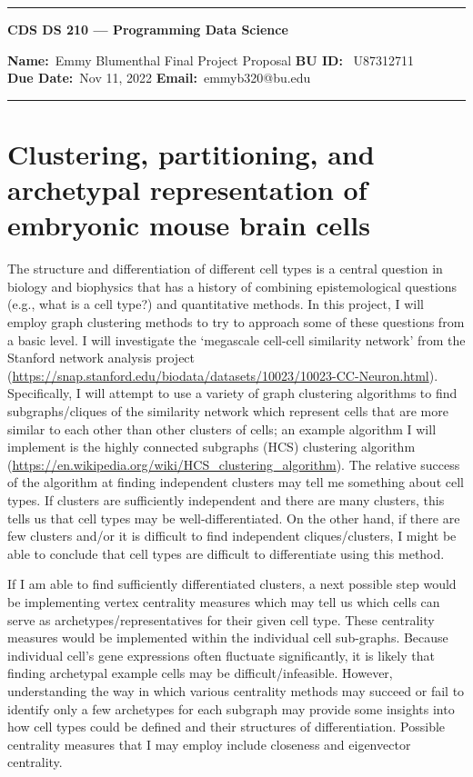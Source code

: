 \documentclass[10pt]{article}
\newcommand{\1}{\mathbf 1}
\begin{document}
\begin{center}
	\hrule
	\vspace{.4cm}
	{\textbf { \large CDS DS 210 --- Programming Data Science}}
\end{center}
{\textbf{Name:}\ Emmy Blumenthal \hspace{\fill} Final Project Proposal\hspace{\fill}  \textbf{BU ID:} \ U87312711 \\
\textbf{Due Date:}\  Nov 11, 2022   \hspace{\fill} \textbf{Email:}\ emmyb320@bu.edu \ 
\vspace{.4cm}
\hrule

\section*{Clustering, partitioning, and archetypal representation of embryonic mouse brain cells}


The structure and differentiation of different cell types is a central question in biology and biophysics that has a history of combining epistemological questions (e.g., what is a cell type?) and quantitative methods.
In this project, I will employ graph clustering methods to try to approach some of these questions from a basic level.
I will investigate the `megascale cell-cell similarity network' from the Stanford network analysis project (\url{https://snap.stanford.edu/biodata/datasets/10023/10023-CC-Neuron.html}).
Specifically, I will attempt to use a variety of graph clustering algorithms to find subgraphs/cliques of the similarity network which represent cells that are more similar to each other than other clusters of cells; an example algorithm I will implement is the highly connected subgraphs (HCS) clustering algorithm (\url{https://en.wikipedia.org/wiki/HCS_clustering_algorithm}).
The relative success of the algorithm at finding independent clusters may tell me something about cell types.
If clusters are sufficiently independent and there are many clusters, this tells us that cell types may be well-differentiated.
On the other hand, if there are few clusters and/or it is difficult to find independent cliques/clusters, I might be able to conclude that cell types are difficult to differentiate using this method.

If I am able to find sufficiently differentiated clusters, a next possible step would be implementing vertex centrality measures which may tell us which cells can serve as archetypes/representatives for their given cell type.
These centrality measures would be implemented within the individual cell sub-graphs.
Because individual cell's gene expressions often fluctuate significantly, it is likely that finding archetypal example cells may be difficult/infeasible.
However, understanding the way in which various centrality methods may succeed or fail to identify only a few archetypes for each subgraph may provide some insights into how cell types could be defined and their structures of differentiation.
Possible centrality measures that I may employ include closeness and eigenvector centrality.

}
\end{document}
